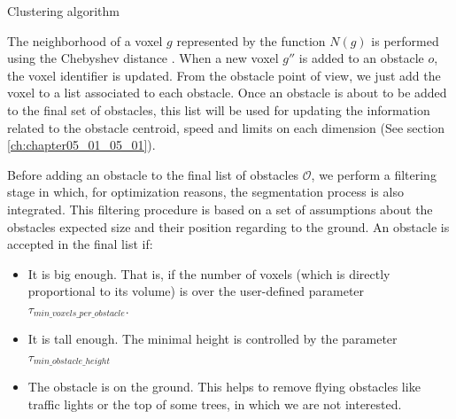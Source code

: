 \begin{algorithm}[t]
\caption{Clustering algorithm}
\label{alg:cp05_clustering}
\begin{algorithmic}
 
      \EndIf
    \EndFor
  \EndWhile
  \EndIf
\EndFor
\EndFunction
\end{algorithmic}
\end{algorithm}

The neighborhood of a voxel $g$ represented by the function $N(g)$ is performed using the Chebyshev distance \citep{broggi2013}. When a new voxel $g''$ is added to an obstacle $o$, the voxel identifier is updated. From the obstacle point of view, we just add the voxel to a list associated to each obstacle. Once an obstacle is about to be added to the final set of obstacles, this list will be used for updating the information related to the obstacle centroid, speed and limits on each dimension (See section \ref{ch:chapter05_01_05_01}).

Before adding an obstacle to the final list of obstacles $\mathcal{O}$, we perform a filtering stage in which, for optimization reasons, the segmentation process is also integrated. This filtering procedure is based on a set of assumptions about the obstacles expected size and their position regarding to the ground. An obstacle is accepted in the final list if:

\begin{itemize}
 \item It is big enough. That is, if the number of voxels (which is directly proportional to its volume) is over the user-defined parameter $\tau_{min\_voxels\_per\_obstacle}$.
 \item It is tall enough. The minimal height is controlled by the parameter\\ $\tau_{min\_obstacle\_height}$
 \item The obstacle is on the ground. This helps to remove flying obstacles like traffic lights or the top of some trees, in which we are not interested.
\end{itemize}

